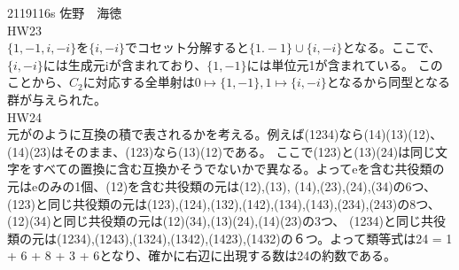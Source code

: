 \documentclass[11pt]{jsarticle}
\begin{document}
2119116s 佐野　海徳\\
HW23\\
$\{1,-1,i,-i\}$を$\{i,-i\}$でコセット分解すると$\{1.-1\}\cup\{i,-i\}$となる。ここで、$\{i,-i\}$には生成元iが含まれており、$\{1,-1\}$には単位元1が含まれている。
このことから、$C_2$に対応する全単射は$0 \mapsto \{1,-1\}, 1 \mapsto \{i,-i\}$となるから同型となる群が与えられた。\\
HW24\\元がのように互換の積で表されるかを考える。例えば(1234)なら(14)(13)(12)、(14)(23)はそのまま、(123)なら(13)(12)である。
ここで(123)と(13)(24)は同じ文字をすべての置換に含む互換かそうでないかで異なる。よってeを含む共役類の元はeのみの1個、(12)を含む共役類の元は(12),(13),
(14),(23),(24),(34)の6つ、(123)と同じ共役類の元は(123),(124),(132),(142),(134),(143),(234),(243)の8つ、(12)(34)と同じ共役類の元は(12)(34),(13)(24),(14)(23)の3つ、
(1234)と同じ共役類の元は(1234),(1243),(1324),(1342),(1423),(1432)の６つ。よって類等式は24 = 1 + 6 + 8 + 3 +  6となり、確かに右辺に出現する数は24の約数である。\\
\end{document}
